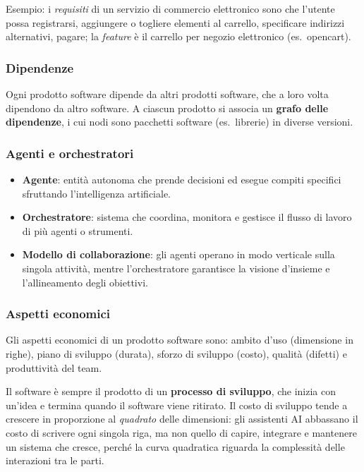 \documentclass[a4paper,12pt]{article}
\begin{document}
Esempio: i \emph{requisiti} di un servizio di commercio elettronico sono che l'utente
possa registrarsi, aggiungere o togliere elementi al carrello, specificare indirizzi
alternativi, pagare; la \emph{feature} è il carrello per negozio elettronico
(es.\ opencart).

\subsubsection{Dipendenze}

Ogni prodotto software dipende da altri prodotti software, che a loro volta dipendono
da altro software. A ciascun prodotto si associa un \textbf{grafo delle dipendenze},
i cui nodi sono pacchetti software (es.\ librerie) in diverse versioni.

\subsubsection{Agenti e orchestratori}

\begin{itemize}
  \item \textbf{Agente}: entità autonoma che prende decisioni ed esegue compiti
        specifici sfruttando l'intelligenza artificiale.
  \item \textbf{Orchestratore}: sistema che coordina, monitora e gestisce il flusso di
        lavoro di più agenti o strumenti.
  \item \textbf{Modello di collaborazione}: gli agenti operano in modo verticale sulla
        singola attività, mentre l'orchestratore garantisce la visione d'insieme e
        l'allineamento degli obiettivi.
\end{itemize}

\subsubsection{Aspetti economici}

Gli aspetti economici di un prodotto software sono: ambito d'uso (dimensione in righe),
piano di sviluppo (durata), sforzo di sviluppo (costo), qualità (difetti) e produttività
del team.

Il software è sempre il prodotto di un \textbf{processo di sviluppo}, che inizia con
un'idea e termina quando il software viene ritirato. Il costo di sviluppo tende a
crescere in proporzione al \emph{quadrato} delle dimensioni: gli assistenti AI abbassano
il costo di scrivere ogni singola riga, ma non quello di capire, integrare e mantenere
un sistema che cresce, perché la curva quadratica riguarda la complessità delle
interazioni tra le parti.
\end{document}

